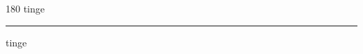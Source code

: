 
\begin{frame}
\begin{center}
\begin{turn}{180}
{\fontsize{2.5cm}{1em}\selectfont tinge}
\end{turn}
\vspace{1em}\par  
\hrule
\vspace{1em}\par  
{\fontsize{2.5cm}{1em}\selectfont tinge}
\end{center}
\end{frame}
